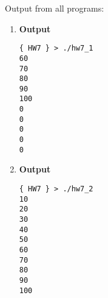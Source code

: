 \documentclass[letterpaper]{article}
\begin{document}
Output from all programs:
\begin{enumerate}
    \item \textbf{Output}
    \begin{verbatim}
{ HW7 } > ./hw7_1
60
70
80
90
100
0
0
0
0
0
    \end{verbatim}
    \item \textbf{Output}
    \begin{verbatim}
{ HW7 } > ./hw7_2
10
20
30
40
50
60
70
80
90
100
    \end{verbatim}
\end{enumerate}
\end{document}
